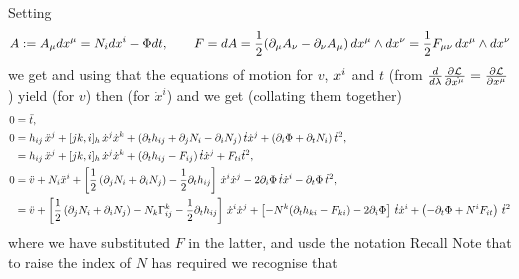 \documentclass{article}
\begin{document}
Setting
$$A:=A_\mu dx\sp{\mu}=N_i dx\sp{i}-\Phi dt,\qquad
F=dA=\frac12 (\partial_\mu A_\nu- \partial_\nu A_\mu)\, dx\sp\mu \wedge dx\sp\nu =\frac12 F_{\mu\nu}
\, dx\sp\mu \wedge dx\sp\nu
$$
we get 
and using that the equations of motion for $v$, $x\sp{i}$ and $t$ (from $\frac{d}{d\lambda}\pd[\mc{L}]{\dot{x^\mu}} = \pd[\mc{L}]{x^\mu}$) yield
(for $v$) then 
(for $\dot{x}^i$) and 
we get (collating them together)
\begin{align*}
0&=\ddot t,\\
0&= h_{ij}\,\ddot x\sp{j}+[jk,i]_h\, \dot x\sp{j} \dot x\sp{k} +
(\partial_t h_{ij}+\partial_j N_i-\partial_i N_j) \,\dot t \dot x\sp{j} +\left(\partial_i\Phi+\partial_t N_i\right) \dot t^2,\\
&= h_{ij}\,\ddot x\sp{j}+[jk,i]_h\, \dot x\sp{j} \dot x\sp{k}+ (\partial_t h_{ij} -F_{ij})\, \dot t \dot x\sp{j}
+F_{ti}\dot t\sp2,\\
0&=\ddot v+ N_i\ddot x\sp{i}+ \left[ \frac12 \left(\partial_j N_i+\partial_i N_j\right)- \frac12 \partial_t h_{ij}
\right]\,\dot x\sp{i} \dot x\sp{j} -2\partial_i\Phi \,\dot t \dot x\sp{i} - \partial_t\Phi\, \dot t^2,\\
&=\ddot v+
 \left[ \frac12 \left(\partial_j N_i+\partial_i N_j\right)-N_k \Gamma\sp{k}_{ij}- \frac12 \partial_t h_{ij}
\right]\,\dot x\sp{i} \dot x\sp{j} 
+\left[ -N\sp{k} (\partial_t h_{ki} -F_{ki}) -2\partial_i\Phi \right]\,\dot t \dot x\sp{i} 
+\left(- \partial_t\Phi +N\sp{i}F_{it} \right)\, \dot t^2
\end{align*}
where we have substituted $F$ in the latter, and usde the notation
Recall 
Note that to raise the index of $N$ has required we recognise that 
\end{document}
